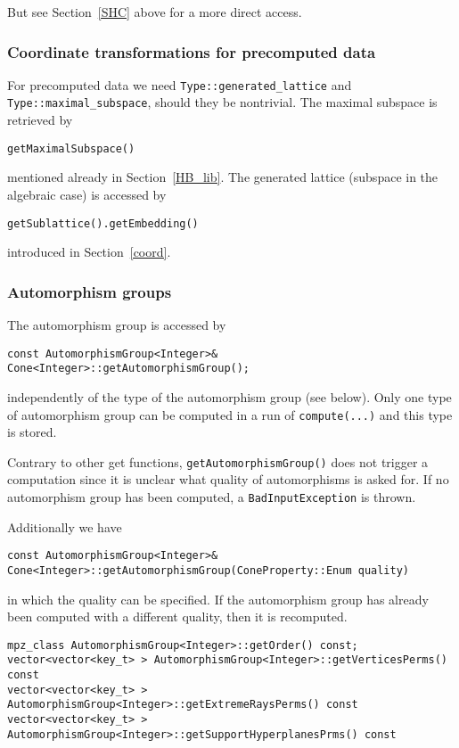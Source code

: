 \documentclass[12pt,a4paper]{scrartcl}
\theoremstyle{definition}
\begin{document}
\begin{small}
But see Section~\ref{SHC} above for a more direct access.

\subsubsection{Coordinate transformations for precomputed data}\label{coord_pre}

For precomputed data we need \verb|Type::generated_lattice| and \verb|Type::maximal_subspace|, should they be nontrivial. The maximal subspace is retrieved by
\begin{Verbatim}
getMaximalSubspace()
\end{Verbatim}
mentioned already in Section~\ref{HB_lib}. The generated lattice (subspace in the algebraic case) is accessed by
\begin{Verbatim}
getSublattice().getEmbedding()
\end{Verbatim}
introduced in Section~\ref{coord}.

\subsubsection{Automorphism groups}

The automorphism group is accessed by

\begin{Verbatim}
const AutomorphismGroup<Integer>& Cone<Integer>::getAutomorphismGroup();
\end{Verbatim}
independently of the type of the automorphism group (see below). Only one type of automorphism group can be computed in a run of \verb|compute(...)| and this type is stored.

Contrary to other get functions, \verb|getAutomorphismGroup()| does not trigger a computation since it is unclear what quality of automorphisms is asked for. If no automorphism group has been computed, a \verb|BadInputException| is thrown.

Additionally we have
\begin{Verbatim}
const AutomorphismGroup<Integer>& 
Cone<Integer>::getAutomorphismGroup(ConeProperty::Enum quality)
\end{Verbatim}
in which the quality can be specified. If the automorphism group has already been computed with a different quality, then it is recomputed.


\begin{Verbatim}
mpz_class AutomorphismGroup<Integer>::getOrder() const;
vector<vector<key_t> > AutomorphismGroup<Integer>::getVerticesPerms() const
vector<vector<key_t> > AutomorphismGroup<Integer>::getExtremeRaysPerms() const
vector<vector<key_t> > AutomorphismGroup<Integer>::getSupportHyperplanesPrms() const


\end{Verbatim}
\end{small}
\end{document}
